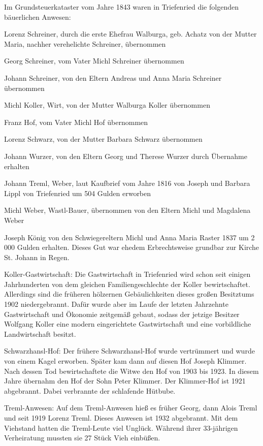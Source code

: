 Im Grundsteuerkataster vom Jahre 1843 waren in Triefenried die folgenden
bäuerlichen Anwesen:



Lorenz Schreiner, durch die erste Ehefrau Walburga, geb. Achatz von der Mutter
Maria, nachher verehelichte Schreiner, übernommen

Georg Schreiner, vom Vater Michl Schreiner übernommen

Johann Schreiner, von den Eltern Andreas und Anna Maria Schreiner übernommen

Michl Koller, Wirt, von der Mutter Walburga Koller übernommen

Franz Hof, vom Vater Michl Hof übernommen

Lorenz Schwarz, von der Mutter Barbara Schwarz übernommen

Johann Wurzer, von den Eltern Georg und Therese Wurzer durch Übernahme erhalten

Johann Treml, Weber, laut Kaufbrief vom Jahre 1816 von Joseph und Barbara Lippl
von Triefenried um 504 Gulden erworben

Michl Weber, Wastl-Bauer, übernommen von den Eltern Michl und Magdalena Weber

Joseph König von den Schwiegereltern Michl und Anna Maria Raster 1837 um 2 000
Gulden erhalten. Dieses Gut war ehedem Erbrechtsweise grundbar zur Kirche St.
Johann in Regen.



Koller-Gastwirtschaft: Die Gastwirtschaft in Triefenried wird schon seit einigen
Jahrhunderten von dem gleichen Familiengeschlechte der Koller bewirtschaftet.
Allerdings sind die früheren hölzernen Gebäulichkeiten dieses großen Besitztums
1902 niedergebrannt. Dafür wurde aber im Laufe der letzten Jahrzehnte
Gastwirtschaft und Ökonomie zeitgemäß gebaut, sodass der jetzige Besitzer
Wolfgang Koller eine modern eingerichtete Gastwirtschaft und eine vorbildliche
Landwirtschaft besitzt.

Schwarzhansl-Hof: Der frühere Schwarzhansl-Hof wurde vertrümmert und wurde von
einem Kagel erworben. Später kam dann auf diesen Hof Joseph Klimmer. Nach dessen
Tod bewirtschaftete die Witwe den Hof von 1903 bis 1923. In diesem Jahre
übernahm den Hof der Sohn Peter Klimmer. Der Klimmer-Hof ist 1921 abgebrannt.
Dabei verbrannte der schlafende Hütbube.

Treml-Anwesen: Auf dem Treml-Anwesen hieß es früher Georg, dann Alois Treml und
seit 1919 Lorenz Treml. Dieses Anwesen ist 1932 abgebrannt. Mit dem Viehstand
hatten die Treml-Leute viel Unglück. Während ihrer 33-jährigen Verheiratung
mussten sie 27 Stück Vieh einbüßen.

